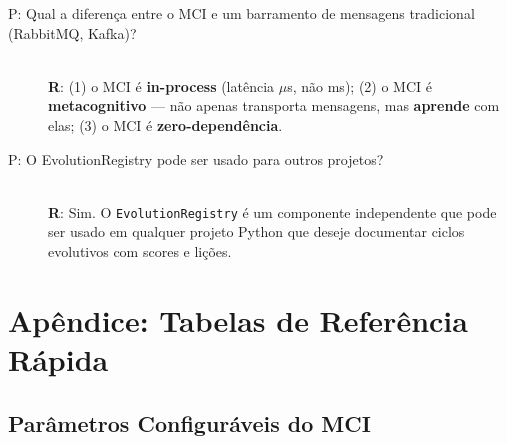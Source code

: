 \begin{description}
    \item[P: Qual a diferença entre o MCI e um barramento de mensagens tradicional (RabbitMQ, Kafka)?] \hfill \\
    \textbf{R}: (1) o MCI é \textbf{in-process} (latência $\mu$s, não ms); (2) o MCI é \textbf{metacognitivo} — não apenas transporta mensagens, mas \textbf{aprende} com elas; (3) o MCI é \textbf{zero-dependência}.
    
    \item[P: O EvolutionRegistry pode ser usado para outros projetos?] \hfill \\
    \textbf{R}: Sim. O \texttt{EvolutionRegistry} é um componente independente que pode ser usado em qualquer projeto Python que deseje documentar ciclos evolutivos com scores e lições.
    
\end{description}

\section{Apêndice: Tabelas de Referência Rápida}
\label{sec:quick-ref}

\subsection{Parâmetros Configuráveis do MCI}


